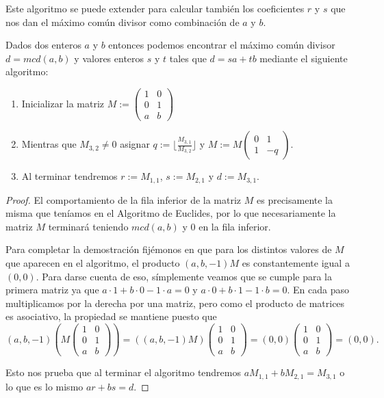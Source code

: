 Este algoritmo se puede extender para calcular tambi\'en los coeficientes $r$ y $s$ que nos dan el m\'aximo com\'un divisor como combinaci\'on de $a$ y $b$.

\begin{algorithm}
Dados dos enteros $a$ y $b$ entonces podemos encontrar el m\'aximo com\'un divisor
$d = mcd(a,b)$ y valores enteros $s$ y $t$ tales que $d = sa+tb$ mediante el siguiente algoritmo:
\begin{enumerate}
\item Inicializar la matriz $M := \left(\begin{array}{cc} 1 & 0 \\ 0 & 1 \\ a & b \end{array}\right)$
\item Mientras que $M_{3,2} \not= 0$ asignar $q := \lfloor \frac{M_{3,1}}{M_{3,2}} \rfloor$ y $M := M \left( \begin{array}{cc} 0 & 1 \\ 1 & -q
\end{array}  \right)$.
\item Al terminar tendremos $r := M_{1,1}$, $s := M_{2,1}$ y $d := M_{3,1}$.
\end{enumerate}
\end{algorithm}
\begin{proof}
El comportamiento de la fila inferior de la matriz $M$ es precisamente la misma que ten\'iamos en el Algoritmo de Euclides, por lo que necesariamente la matriz $M$ terminar\'a teniendo
$mcd(a,b)$ y $0$ en la fila inferior.

Para completar la demostraci\'on fij\'emonos en que para los distintos valores de $M$ que aparecen en el algoritmo, el producto $\left( a,b,-1\right) M$ es constantemente igual a
$\left(0,0\right)$. Para darse cuenta de eso, s\'implemente veamos que se cumple para la primera matriz ya que $a\cdot 1 + b \cdot 0 - 1 \cdot a = 0$ y
$a\cdot 0 + b \cdot 1 - 1 \cdot b = 0$. En cada paso multiplicamos por la derecha por una matriz, pero como el producto de matrices es asociativo, la propiedad se mantiene puesto que
\[(a,b,-1)\left(M \left(\begin{array}{cc} 1 & 0 \\ 0 & 1 \\ a & b \end{array}\right)\right) = \left((a,b,-1)M \right)\left(\begin{array}{cc} 1 & 0 \\ 0 & 1 \\ a & b \end{array}\right) =
(0,0)\left(\begin{array}{cc} 1 & 0 \\ 0 & 1 \\ a & b \end{array}\right) = (0,0).\]

Esto nos prueba que al terminar el algoritmo tendremos $a M_{1,1} + b M_{2,1} = M_{3,1}$ o lo que es lo mismo $a r + b s = d$.
\end{proof}

